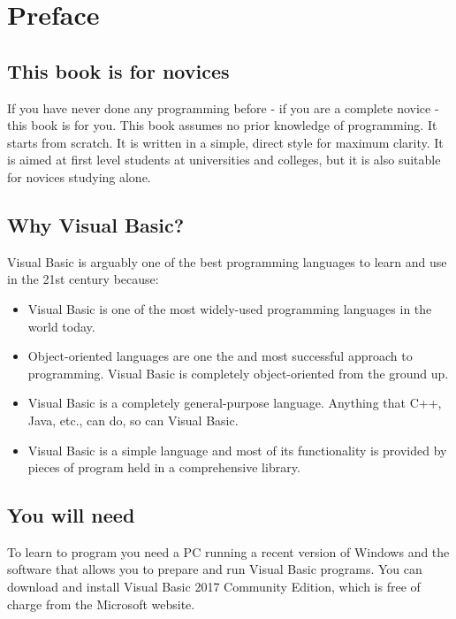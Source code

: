 \chapter{Preface}

	\section*{This book is for novices}
		If you have never done any programming before - if you are a complete novice - this book is for you. This book assumes no prior knowledge of programming. It starts from scratch. It is written in a simple, direct style for maximum clarity. It is aimed at first level students at universities and colleges, but it is also suitable for novices studying alone.


	\section*{Why Visual Basic?}
		Visual Basic is arguably one of the best programming languages to learn and use in the 21st century because:
		\begin{itemize}
			\item	Visual Basic is one of the most widely-used programming languages in the world today.
			\item	Object-oriented languages are one the and most successful approach to programming. Visual Basic is completely object-oriented from the ground up.
			\item Visual Basic is a completely general-purpose language. Anything that C++, Java, etc., can do, so can Visual Basic.
			\item	Visual Basic is a simple language and most of its functionality is provided by pieces of program held in a comprehensive library.
		\end{itemize}


	\section*{You will need}
		To learn to program you need a PC running a recent version of Windows and the software that allows you to prepare and run Visual Basic programs. You can download and install Visual Basic 2017 Community Edition, which is free of charge from the Microsoft website.


